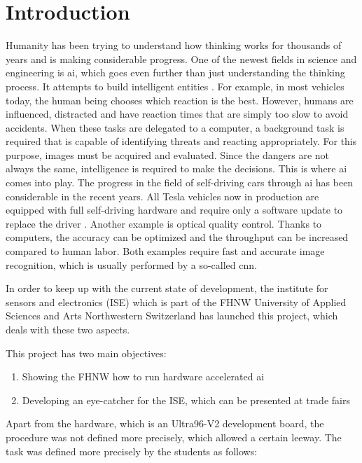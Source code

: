 \chapter*{Introduction}
\label{ch:introduction}

Humanity has been trying to understand how thinking works for thousands of years and is making considerable progress.
One of the newest fields in science and engineering is \acrfull{ai}, which goes even further than just understanding the thinking process.
It attempts to build intelligent entities \cite{ai}.
For example, in most vehicles today, the human being chooses which reaction is the best.
However, humans are influenced, distracted and have reaction times that are simply too slow to avoid accidents.
When these tasks are delegated to a computer, a background task is required that is capable of identifying threats and reacting appropriately.
For this purpose, images must be acquired and evaluated.
Since the dangers are not always the same, intelligence is required to make the decisions.
This is where \acrshort{ai} comes into play.
The progress in the field of self-driving cars through \acrshort{ai} has been considerable in the recent years.
All Tesla vehicles now in production are equipped with full self-driving hardware and require only a software update to replace the driver \cite{tesla_self_driving_cars}.
Another example is optical quality control.
Thanks to computers, the accuracy can be optimized and the throughput can be increased compared to human labor.
Both examples require fast and accurate image recognition, which is usually performed by a so-called \acrfull{cnn}.

In order to keep up with the current state of development, the institute for sensors and electronics (ISE) which is part of the FHNW University of Applied Sciences and Arts Northwestern Switzerland has launched this project, which deals with these two aspects.

This project has two main objectives:

\begin{enumerate}
  \item Showing the FHNW how to run hardware accelerated \acrshort{ai}
  \item Developing an eye-catcher for the ISE, which can be presented at trade fairs
\end{enumerate}

Apart from the hardware, which is an Ultra96-V2 development board, the procedure was not defined more precisely, which allowed a certain leeway.
The task was defined more precisely by the students as follows:

